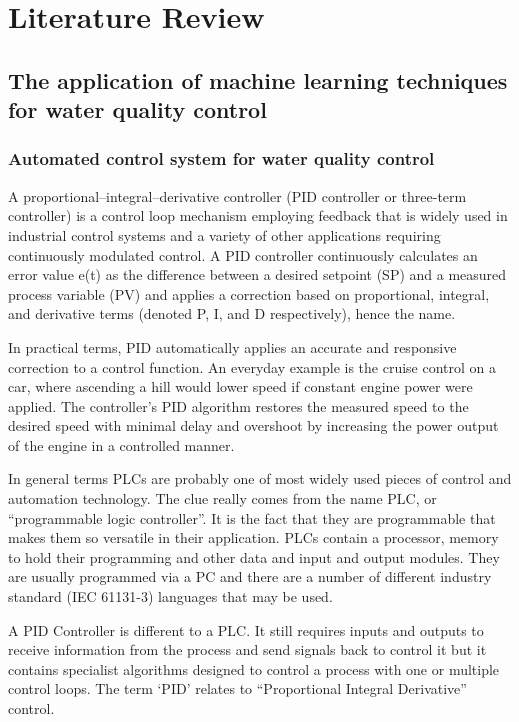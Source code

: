 \chapter{Literature Review}

\section{The application of machine learning techniques for water quality control}
\subsection{Automated control system for water quality control}


A proportional–integral–derivative controller (PID controller or three-term controller) is a control loop mechanism employing feedback that is widely used in industrial control systems and a variety of other applications requiring continuously modulated control. A PID controller continuously calculates an error value e(t) as the difference between a desired setpoint (SP) and a measured process variable (PV) and applies a correction based on proportional, integral, and derivative terms (denoted P, I, and D respectively), hence the name.


In practical terms, PID automatically applies an accurate and responsive correction to a control function. An everyday example is the cruise control on a car, where ascending a hill would lower speed if constant engine power were applied. The controller's PID algorithm restores the measured speed to the desired speed with minimal delay and overshoot by increasing the power output of the engine in a controlled manner.

In general terms PLCs are probably one of most widely used pieces of control and automation technology. The clue really comes from the name PLC, or “programmable logic controller”. It is the fact that they are programmable that makes them so versatile in their application. PLCs contain a processor, memory to hold their programming and other data and input and output modules. They are usually programmed via a PC and there are a number of different industry standard (IEC 61131-3) languages that may be used.

A PID Controller is different to a PLC. It still requires inputs and outputs to receive information from the process and send signals back to control it but it contains specialist algorithms designed to control a process with one or multiple control loops. The term ‘PID’ relates to “Proportional Integral Derivative” control. 

